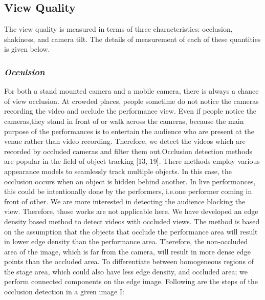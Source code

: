 \documentclass{IEEEtran}
\begin{document}
\subsection{View Quality}
The view quality is measured in terms of three characteristics: occlusion, shakiness, and camera tilt. The details of measurement of each of these quantities is given below.
\subsubsection{\textit{Occulsion}}
For both a stand mounted camera and a mobile camera, there is always a chance of view occlusion. At crowded places, people sometime do not notice the cameras recording the video and occlude the performance view. Even if people notice the cameras,they stand in front of or walk across the cameras, because the main purpose of the performances is to entertain the audience who are
present at the venue rather than video recording.\cite{web:5} Therefore, we detect the videos which are recorded by occluded cameras and filter them out.Occlusion detection methods are popular in the field of object tracking [13, 19]. There methods employ various appearance models to seamlessly track multiple objects. In this case, the occlusion occurs when an object is hidden behind another. In live performances, this could be intentionally done by the performers, i.e.one performer coming in front of other. We are more interested in detecting the audience blocking the view. Therefore, those works are not applicable here.
We have developed an edge density based method to detect videos with occluded views. The method is based on the assumption that the objects that occlude the performance area will result in lower edge density than the performance area. Therefore, the non-occluded area of the image, which is far from the camera, will result in more dense edge points than the occluded area. To differentiate between homogeneous regions of the stage area, which could also have less edge density, and occluded area; we perform connected components on the edge image. Following are the steps of the occlusion detection in a given image I:
\end{document}

